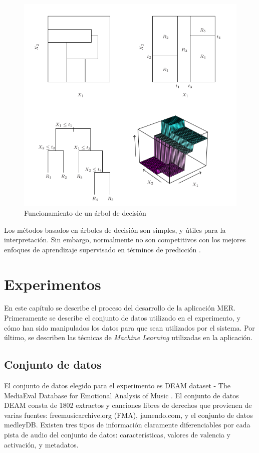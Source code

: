 \documentclass[12pt,a4paper,Spanish]{article}
\begin{document}
\begin{figure}[H]
	\centering
	\includegraphics[width=0.7\linewidth]{figs/decission_tree}
	\caption{Funcionamiento de un árbol de decisión}
	\label{fig:decissiontree}
\end{figure}


Los métodos basados en árboles de decisión son simples, y útiles para la interpretación. Sin embargo, normalmente no son competitivos con los mejores enfoques de aprendizaje supervisado en términos de predicción \cite{gareth2013introduction}.







\newpage
\section{Experimentos}
En este capítulo se describe el proceso del desarrollo de la aplicación MER. Primeramente se describe el conjunto de datos utilizado en el experimento, y cómo han sido manipulados los datos para que sean utilizados por el sistema. Por último, se describen las técnicas de \textit{Machine Learning} utilizadas en la aplicación.


\subsection{Conjunto de datos}
El conjunto de datos elegido para el experimento es DEAM dataset - The MediaEval Database for Emotional Analysis of Music \cite{AlajankiEmoInMusicAnalysis}. El conjunto de datos DEAM consta de 1802 extractos y canciones libres de derechos que provienen de varias fuentes: freemusicarchive.org (FMA), jamendo.com,
y el conjunto de datos medleyDB.
\newline
Existen tres tipos de información claramente diferenciables por cada pista de audio del conjunto de datos: características, valores de valencia y activación, y metadatos.
\end{document}
